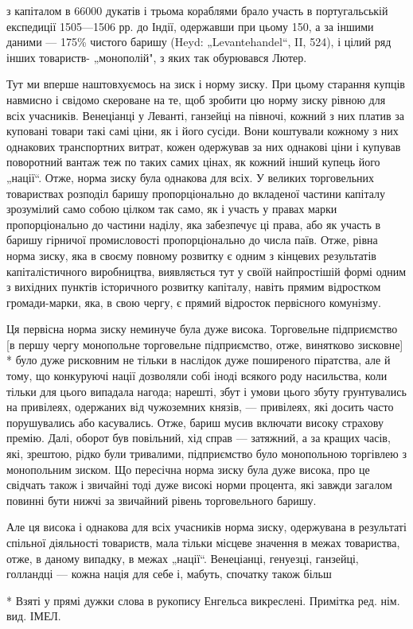 \parcont{}  %
з капіталом в 66000 дукатів і трьома кораблями брало участь в португальській експедиції 1505—1506 рр. до Індії, одержавши
при цьому 150, а за іншими даними — 175\% чистого баришу (Heyd: „Levantehandel“, II, 524), і цілий ряд інших товариств-
„монополій", з яких так обурювався Лютер.

Тут ми вперше наштовхуємось на зиск і норму зиску. При цьому старання купців
навмисно і свідомо скероване на те, щоб зробити цю норму зиску рівною для всіх учасників. Венеціанці у Леванті, ганзейці на
півночі, кожний з них платив за куповані товари такі самі ціни, як і його сусіди. Вони коштували кожному з них однакових
транспортних витрат, кожен одержував за них однакові ціни і купував поворотний вантаж теж по таких самих цінах, як кожний
інший купець його „нації“. Отже, норма зиску була однакова для всіх. У великих торговельних товариствах розподіл баришу
пропорціонально до вкладеної частини капіталу зрозумілий само собою цілком так само, як і участь у правах марки
пропорціонально до частини наділу, яка забезпечує ці права, або як участь в баришу гірничої промисловості пропорціонально
до числа паїв. Отже, рівна норма зиску, яка в своєму повному розвитку є одним з кінцевих результатів капіталістичного
виробництва, виявляється тут у своїй найпростішій формі одним з вихідних пунктів історичного розвитку капіталу, навіть
прямим відростком громади-марки, яка, в свою чергу, є прямий відросток первісного комунізму.

Ця первісна норма зиску
неминуче була дуже висока. Торговельне підприємство [в першу чергу монопольне торговельне підприємство, отже, винятково
зисковне] * було дуже рисковним не тільки в наслідок дуже поширеного піратства, але й тому, що конкуруючі нації дозволяли
собі іноді всякого роду насильства, коли тільки для цього випадала нагода; нарешті, збут і умови цього збуту грунтувались
на привілеях, одержаних від чужоземних князів, — привілеях, які досить часто порушувались або касувались. Отже, бариш
мусив включати високу страхову премію. Далі, оборот був повільний, хід справ — затяжний, а за кращих часів, які, зрештою,
рідко були тривалими, підприємство було монопольною торгівлею з монопольним зиском. Що пересічна норма зиску була дуже
висока, про це свідчать також і звичайні тоді дуже високі норми процента, які завжди загалом повинні бути нижчі за
звичайний рівень торговельного баришу.

Але ця висока і однакова для всіх учасників норма зиску, одержувана в результаті
спільної діяльності товариств, мала тільки місцеве значення в межах товариства, отже, в даному випадку, в межах „нації“.
Венеціанці, генуезці, ганзейці, голландці — кожна нація для себе і, мабуть, спочатку також більш

* Взяті у прямі дужки слова в рукопису Енгельса викреслені. Примітка ред. нім. вид. ІМЕЛ.
\parbreak{}  %
